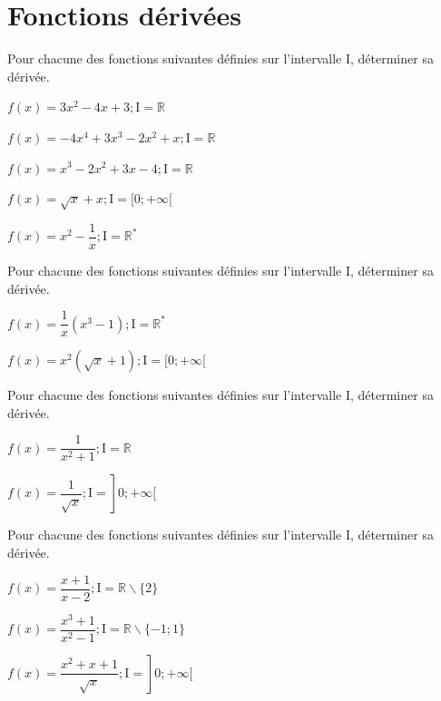 \documentclass[12pt,a4paper]{article}  %
\begin{document}
\section*{Fonctions dérivées}

\exercice{}

Pour chacune des fonctions suivantes définies sur l'intervalle I, déterminer sa dérivée.
\begin{enumMet}
	\item $f(x)=3 x^2-4 x+3 ; \mathrm{I}=\mathbb{R}$
	\item $f(x)=-4 x^4+3 x^3-2 x^2+x ; \mathrm{I}=\mathbb{R}$
	\item $f(x)=x^3-2 x^2+3 x-4 ; \mathrm{I}=\mathbb{R}$
	\item $f(x)=\sqrt{x}+x ; \mathrm{I}=[0 ;+\infty[$
	\item $f(x)=x^2-\dfrac{1}{x} ; \mathrm{I}=\mathbb{R}^*$		
\end{enumMet}

\exercice{}

Pour chacune des fonctions suivantes définies sur l'intervalle I, déterminer sa dérivée.
\begin{enumMet}
	\item $f(x)=\dfrac{1}{x}\left(x^3-1\right) ; \mathrm{I}=\mathbb{R}^*$
	\item $f(x)=x^2(\sqrt{x}+1) ; \mathrm{I}=[0 ;+\infty[$	
\end{enumMet}

\exercice{}

Pour chacune des fonctions suivantes définies sur l'intervalle I, déterminer sa dérivée.
\begin{enumMet}
	\item $f(x)=\dfrac{1}{x^2+1} ; \mathrm{I}=\mathbb{R}$
	\item $\left.f(x)=\dfrac{1}{\sqrt{x}} ; \mathrm{I}=\right] 0 ;+\infty[$
	
\end{enumMet}

\exercice{}

Pour chacune des fonctions suivantes définies sur l'intervalle I, déterminer sa dérivée.
\begin{enumMet}
	\item $f(x)=\dfrac{x+1}{x-2} ; \mathrm{I}=\mathbb{R} \backslash\{2\}$
	\item $f(x)=\dfrac{x^3+1}{x^2-1} ; \mathrm{I}=\mathbb{R} \backslash\{-1 ; 1\}$
	\item $\left.f(x)=\dfrac{x^2+x+1}{\sqrt{x}} ; \mathrm{I}=\right] 0 ;+\infty[$
\end{enumMet}
\end{document}
